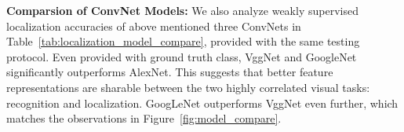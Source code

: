 \textbf{Comparsion of ConvNet Models:} We also analyze  weakly supervised localization accuracies of above mentioned three ConvNets in Table~\ref{tab:localization_model_compare}, provided with the same testing protocol. Even provided with ground truth class, VggNet and GoogleNet significantly outperforms AlexNet.
This suggests that better feature representations are sharable between the two highly correlated visual tasks: recognition and localization. GoogLeNet outperforms VggNet even further, which matches the observations in Figure~\ref{fig:model_compare}.





